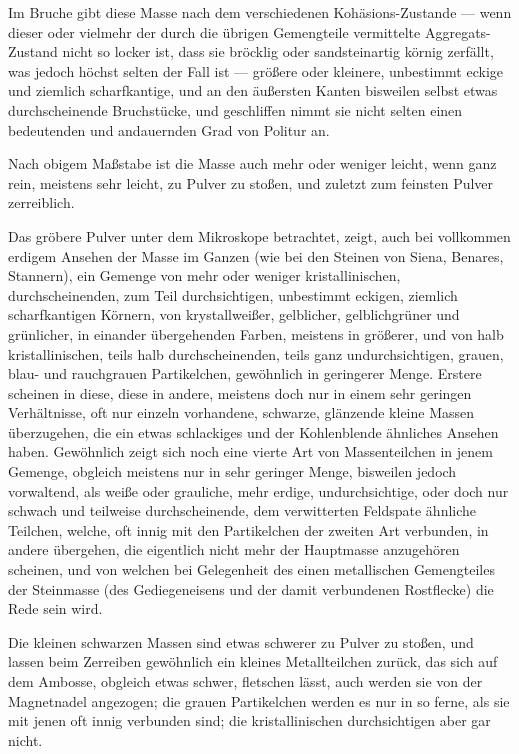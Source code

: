 \documentclass[a4paper, 11pt, oneside, german]{article}
\begin{document}
Im Bruche gibt diese Masse nach dem verschiedenen Kohäsions-Zustande --- wenn dieser oder vielmehr der durch die übrigen Gemengteile vermittelte Aggregats-Zustand nicht so locker ist, dass sie bröcklig oder sandsteinartig körnig zerfällt, was jedoch höchst selten der Fall ist --- größere oder kleinere, unbestimmt eckige und ziemlich scharfkantige, und an den äußersten Kanten bisweilen selbst etwas durchscheinende Bruchstücke, und geschliffen nimmt sie nicht selten einen bedeutenden und andauernden Grad von Politur an.

Nach obigem Maßstabe ist die Masse auch mehr oder weniger leicht, wenn ganz rein, meistens sehr leicht, zu Pulver zu stoßen, und zuletzt zum feinsten Pulver zerreiblich.

Das gröbere Pulver unter dem Mikroskope betrachtet, zeigt, auch bei vollkommen erdigem Ansehen der Masse im Ganzen (wie bei den Steinen von Siena, Benares, Stannern), ein Gemenge von mehr oder weniger kristallinischen, durchscheinenden, zum Teil durchsichtigen, unbestimmt eckigen, ziemlich scharfkantigen Körnern, von krystallweißer, gelblicher, gelblichgrüner und grünlicher, in einander übergehenden Farben, meistens in größerer, und von halb kristallinischen, teils halb durchscheinenden, teils ganz undurchsichtigen, grauen, blau- und rauchgrauen Partikelchen, gewöhnlich in geringerer Menge. Erstere scheinen in diese, diese in andere, meistens doch nur in einem sehr geringen Verhältnisse, oft nur einzeln vorhandene, schwarze, glänzende kleine Massen überzugehen, die ein etwas schlackiges und der Kohlenblende ähnliches Ansehen haben. Gewöhnlich zeigt sich noch eine vierte Art von Massenteilchen in jenem Gemenge, obgleich meistens nur in sehr geringer Menge, bisweilen jedoch vorwaltend, als weiße oder grauliche, mehr erdige, undurchsichtige, oder doch nur schwach und teilweise durchscheinende, dem verwitterten Feldspate ähnliche Teilchen, welche, oft innig mit den Partikelchen der zweiten Art verbunden, in andere übergehen, die eigentlich nicht mehr der Hauptmasse anzugehören scheinen, und von welchen bei Gelegenheit des einen metallischen Gemengteiles der Steinmasse (des Gediegeneisens und der damit verbundenen Rostflecke) die Rede sein wird.

Die kleinen schwarzen Massen sind etwas schwerer zu Pulver zu stoßen, und lassen beim Zerreiben gewöhnlich ein kleines Metallteilchen zurück, das sich auf dem Ambosse, obgleich etwas schwer, fletschen lässt, auch werden sie von der Magnetnadel angezogen; die grauen Partikelchen werden es nur in so ferne, als sie mit jenen oft innig verbunden sind; die kristallinischen durchsichtigen aber gar nicht.
\end{document}
